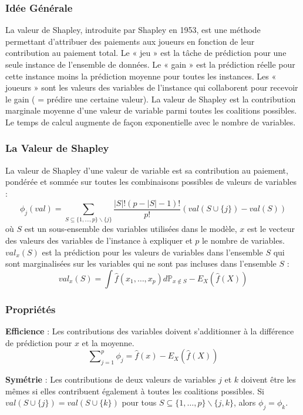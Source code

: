 \subsubsection{Idée Générale}
La valeur de Shapley, introduite par Shapley en 1953, est une méthode permettant d'attribuer des paiements aux joueurs en fonction de leur contribution au paiement total. Le « jeu » est la tâche de prédiction pour une seule instance de l'ensemble de données. Le « gain » est la prédiction réelle pour cette instance moins la prédiction moyenne pour toutes les instances. Les « joueurs » sont les valeurs des variables de l'instance qui collaborent pour recevoir le gain ( = prédire une certaine valeur). La valeur de Shapley est la contribution marginale moyenne d'une valeur de variable parmi toutes les coalitions possibles. Le temps de calcul augmente de façon exponentielle avec le nombre de variables.

\subsubsection{La Valeur de Shapley}
La valeur de Shapley d'une valeur de variable est sa contribution au paiement, pondérée et sommée sur toutes les combinaisons possibles de valeurs de variables :
\[
\phi_j(val)=\sum_{{S\subseteq\{1,\ldots,p\} \backslash \{j\}}}\frac{{|S|!(p-|S|-1)!}}{{p!}}\left(val\left(S\cup\{j\}\right)-val(S)\right)
\]
où \( S \) est un sous-ensemble des variables utilisées dans le modèle, \( x \) est le vecteur des valeurs des variables de l'instance à expliquer et \( p \) le nombre de variables.
\( val_x(S) \) est la prédiction pour les valeurs de variables dans l'ensemble \( S \) qui sont marginalisées sur les variables qui ne sont pas incluses dans l'ensemble \( S \) :
\[
val_{x}(S)=\int\hat{f}(x_{1},\ldots,x_{p})d\mathbb{P}_{x\notin{}S}-E_X(\hat{f}(X))
\]

\subsubsection{Propriétés}
\textbf{Efficience} : Les contributions des variables doivent s'additionner à la différence de prédiction pour \( x \) et la moyenne.
\[
\sum\nolimits_{{j=1}}^p\phi_j=\hat{f}(x)-E_X(\hat{f}(X))
\]

\textbf{Symétrie} : Les contributions de deux valeurs de variables \( j \) et \( k \) doivent être les mêmes si elles contribuent également à toutes les coalitions possibles.
Si \( val(S \cup \{j\})=val(S\cup\{k\}) \) pour tous \( S\subseteq\{1,\ldots, p\} \backslash \{j,k\} \), alors \( \phi_j=\phi_{k} \).

